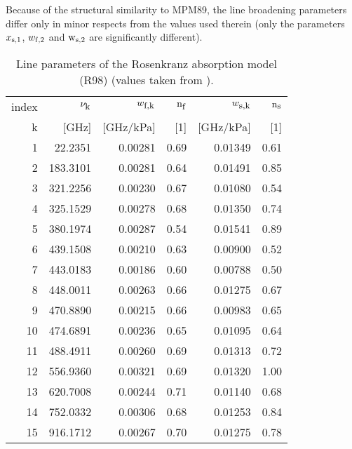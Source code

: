 Because of the structural similarity to MPM89, the line broadening 
parameters differ only in minor respects from the values used therein 
(only the parameters $x_{\rm s,1}$, $w_{\rm f,2}$ and $\rm w_{\rm s,2}$ 
are significantly different).
%
\begin{table}[!htb]
\begin{center}
\begin{tabular}{rrrrrr}
 \hline
 index &  $\nu_{\mbox{\rm \small k}}$      & $w_{\mbox{\rm \small f,k}}$     & ${\rm n}_{\mbox{\rm \small f}}$ & $w_{\mbox{\rm \small s,k}}$     & ${\rm n}_{\mbox{\rm \small s}}$ \\
   k   &  [GHz]       & [GHz/kPa] & [1]   & [GHz/kPa] & [1] \\ 
 \hline
   1   &   22.2351    & 0.00281   & 0.69  & 0.01349   &  0.61 \\
   2   &  183.3101    & 0.00281   & 0.64  & 0.01491   &  0.85 \\
   3   &  321.2256    & 0.00230   & 0.67  & 0.01080   &  0.54 \\
  4    &  325.1529    & 0.00278   & 0.68  & 0.01350   &  0.74 \\
  5    &  380.1974    & 0.00287   & 0.54  & 0.01541   &  0.89 \\
  6    &  439.1508    & 0.00210   & 0.63  & 0.00900   &  0.52 \\
  7    &  443.0183    & 0.00186   & 0.60  & 0.00788   &  0.50 \\
  8    &  448.0011    & 0.00263   & 0.66  & 0.01275   &  0.67 \\
  9    &  470.8890    & 0.00215   & 0.66  & 0.00983   &  0.65 \\
  10   &  474.6891    & 0.00236   & 0.65  & 0.01095   &  0.64 \\
  11   &  488.4911    & 0.00260   & 0.69  & 0.01313   &  0.72 \\
  12   &  556.9360    & 0.00321   & 0.69  & 0.01320   &  1.00 \\
  13   &  620.7008    & 0.00244   & 0.71  & 0.01140   &  0.68 \\
  14   &  752.0332    & 0.00306   & 0.68  & 0.01253   &  0.84 \\
  15   &  916.1712    & 0.00267   & 0.70  & 0.01275   &  0.78 \\
  \hline
\end{tabular}
\end{center}
  \caption{Line parameters of the Rosenkranz absorption model (R98) 
  (values taken from \citet{pwr:98}).}
\label{tab:pwr98linelist}
\end{table}



